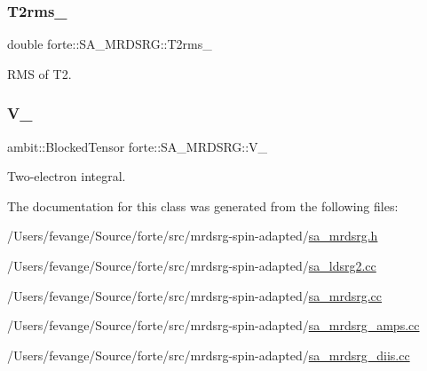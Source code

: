 \subsubsection{\texorpdfstring{T2rms\+\_\+}{T2rms\_}}
{\footnotesize\ttfamily double forte\+::\+S\+A\+\_\+\+M\+R\+D\+S\+R\+G\+::\+T2rms\+\_\+\hspace{0.3cm}{\ttfamily [protected]}}



R\+MS of T2. 

\mbox{\label{classforte_1_1_s_a___m_r_d_s_r_g_a2d98d0cdfa544104238d1277ca253539}} 
\subsubsection{\texorpdfstring{V\+\_\+}{V\_}}
{\footnotesize\ttfamily ambit\+::\+Blocked\+Tensor forte\+::\+S\+A\+\_\+\+M\+R\+D\+S\+R\+G\+::\+V\+\_\+\hspace{0.3cm}{\ttfamily [protected]}}



Two-\/electron integral. 



The documentation for this class was generated from the following files\+:\begin{DoxyCompactItemize}
\item 
/\+Users/fevange/\+Source/forte/src/mrdsrg-\/spin-\/adapted/\mbox{\hyperlink{sa__mrdsrg_8h}{sa\+\_\+mrdsrg.\+h}}\item 
/\+Users/fevange/\+Source/forte/src/mrdsrg-\/spin-\/adapted/\mbox{\hyperlink{sa__ldsrg2_8cc}{sa\+\_\+ldsrg2.\+cc}}\item 
/\+Users/fevange/\+Source/forte/src/mrdsrg-\/spin-\/adapted/\mbox{\hyperlink{sa__mrdsrg_8cc}{sa\+\_\+mrdsrg.\+cc}}\item 
/\+Users/fevange/\+Source/forte/src/mrdsrg-\/spin-\/adapted/\mbox{\hyperlink{sa__mrdsrg__amps_8cc}{sa\+\_\+mrdsrg\+\_\+amps.\+cc}}\item 
/\+Users/fevange/\+Source/forte/src/mrdsrg-\/spin-\/adapted/\mbox{\hyperlink{sa__mrdsrg__diis_8cc}{sa\+\_\+mrdsrg\+\_\+diis.\+cc}}\end{DoxyCompactItemize}
